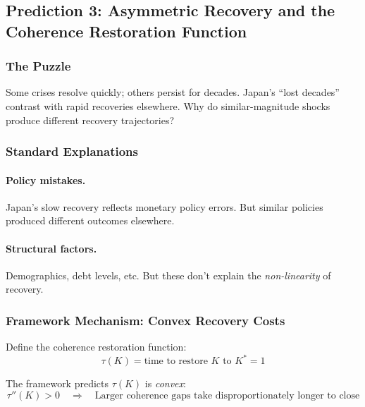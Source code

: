 \subsection{Prediction 3: Asymmetric Recovery and the Coherence Restoration Function}
\label{subsec:pred-asymmetric}

\subsubsection{The Puzzle}

Some crises resolve quickly; others persist for decades. Japan's ``lost decades'' 
contrast with rapid recoveries elsewhere. Why do similar-magnitude shocks 
produce different recovery trajectories?

\subsubsection{Standard Explanations}

\paragraph{Policy mistakes.} Japan's slow recovery reflects monetary policy errors.
But similar policies produced different outcomes elsewhere.

\paragraph{Structural factors.} Demographics, debt levels, etc.
But these don't explain the \emph{non-linearity} of recovery.

\subsubsection{Framework Mechanism: Convex Recovery Costs}

Define the coherence restoration function:
\begin{equation}
\tau(K) = \text{time to restore } K \text{ to } K^* = 1
\end{equation}

The framework predicts $\tau(K)$ is \emph{convex}:
\begin{equation}
\tau''(K) > 0 \quad \Rightarrow \quad \text{Larger coherence gaps take disproportionately longer to close}
\end{equation}

